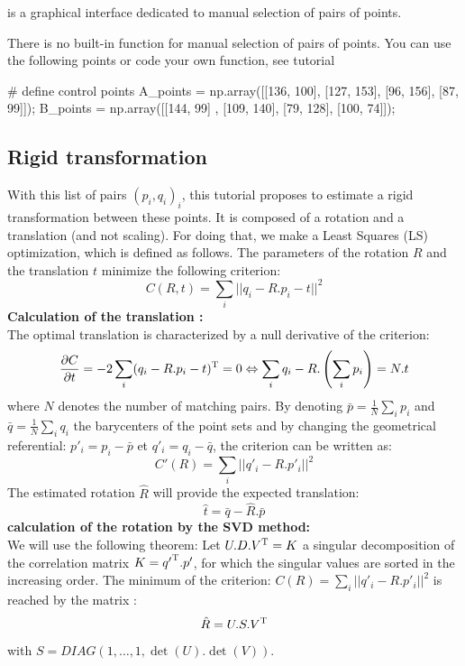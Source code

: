 \begin{mcomment}
\begin{mremark}
 is a graphical interface dedicated to manual selection of pairs of points. 
\end{mremark}
\end{mcomment}

\begin{pcomment}
\begin{premark}
 There is no built-in function for manual selection of pairs of points. You can use the following points or code your own function, see tutorial 
 \begin{python}
# define control points
A_points = np.array([[136, 100], [127, 153], [96, 156], [87, 99]]);
B_points = np.array([[144, 99] , [109, 140], [79, 128], [100, 74]]);  
 \end{python}

\end{premark}
\end{pcomment}


\subsection{Rigid transformation}
With this list of pairs ${(p_i,q_i)}_i$, this tutorial proposes to estimate a rigid transformation between these points. It is composed of a rotation and a translation (and not scaling).
For doing that, we make a Least Squares (LS) optimization, which is defined as follows.
The parameters of the rotation $R$ and the translation $t$ minimize the following criterion:
	$$
	C(R,t)=\sum_i ||q_i-R.p_i-t||^2
	$$ 
	\textbf{Calculation of the translation :}\\
	The optimal translation is characterized by a null derivative of the criterion:
	$$
	\frac{\partial C}{\partial t}=-2\sum_i(q_i - R.p_i-t)^{\textsc{T}}=0 \Leftrightarrow \sum_i q_i-R.\left(\sum_i p_i\right) = N.t
	$$
	where $N$ denotes the number of matching pairs.
	By denoting $\bar{p}=\frac{1}{N}\sum_i p_i$ and $\bar{q}=\frac{1}{N}\sum_i q_i$ the barycenters of the point sets
	and by changing the geometrical referential: $p'_i=p_i-\bar{p}$ et $q'_i=q_i-\bar{q}$, the criterion can be written as:
	$$
	C'(R)=\sum_i ||q'_i-R.p'_i||^2
	$$
	The estimated rotation $\hat{R}$ will provide the expected translation:
	\begin{equation}
	\hat{t}=\bar{q}-\hat{R}.\bar{p}\label{eq:registration:enonce:translation}
	\end{equation}
	\textbf{calculation of the rotation by the SVD method:}\\ 
	We will use the following theorem:
	Let $U.D.V^{\textsc{T}}=K$ a singular decomposition of the correlation matrix $K={q'}^{\textsc{T}}.{p'}$, for which the singular values are sorted in the increasing order. The minimum of the criterion: $C(R)=\sum_i ||q'_i-R.p'_i||^2$ is reached by the matrix :
	\begin{equation}\hat{R}=U.S.V^{\textsc{T}} 
	 \label{eq:registration:enonce:rotation}
	\end{equation}
with $S=DIAG(1,\dots,1,\det(U).\det(V))$.


